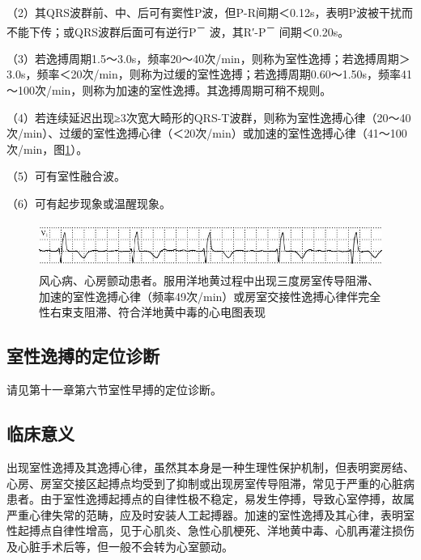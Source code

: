 （2）其QRS波群前、中、后可有窦性P波，但P-R间期＜0.12s，表明P波被干扰而不能下传；或QRS波群后面可有逆行P\textsuperscript{－}
波，其R′-P\textsuperscript{－} 间期＜0.20s。

（3）若逸搏周期1.5～3.0s，频率20～40次/min，则称为室性逸搏；若逸搏周期＞3.0s，频率＜20次/min，则称为过缓的室性逸搏；若逸搏周期0.60～1.50s，频率41～100次/min，则称为加速的室性逸搏。其逸搏周期可稍不规则。

（4）若连续延迟出现≥3次宽大畸形的QRS-T波群，则称为室性逸搏心律（20～40次/min）、过缓的室性逸搏心律（＜20次/min）或加速的室性逸搏心律（41～100次/min，图\ref{fig12-14}）。

（5）可有室性融合波。

（6）可有起步现象或温醒现象。

\begin{figure}[!htbp]
 \centering
 \includegraphics[width=5.5625in,height=0.59375in]{./images/Image00208.jpg}
 \captionsetup{justification=centering}
 \caption{风心病、心房颤动患者。服用洋地黄过程中出现三度房室传导阻滞、加速的室性逸搏心律（频率49次/min）或房室交接性逸搏心律伴完全性右束支阻滞、符合洋地黄中毒的心电图表现}
 \label{fig12-14}
  \end{figure} 

\protect\hypertarget{text00019.htmlux5cux23subid188}{}{}

\subsection{室性逸搏的定位诊断}

请见第十一章第六节室性早搏的定位诊断。

\protect\hypertarget{text00019.htmlux5cux23subid189}{}{}

\subsection{临床意义}

出现室性逸搏及其逸搏心律，虽然其本身是一种生理性保护机制，但表明窦房结、心房、房室交接区起搏点均受到了抑制或出现房室传导阻滞，常见于严重的心脏病患者。由于室性逸搏起搏点的自律性极不稳定，易发生停搏，导致心室停搏，故属严重心律失常的范畴，应及时安装人工起搏器。加速的室性逸搏及其心律，表明室性起搏点自律性增高，见于心肌炎、急性心肌梗死、洋地黄中毒、心肌再灌注损伤及心脏手术后等，但一般不会转为心室颤动。

